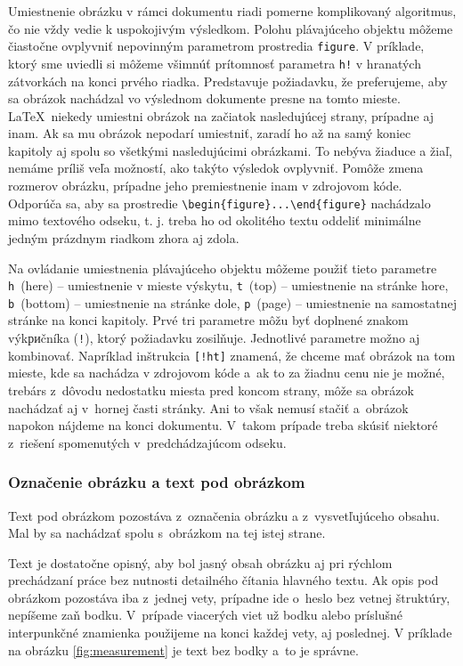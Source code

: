 \documentclass[../../../thesis.tex]{subfiles}
\begin{document}
Umiestnenie obrázku v rámci dokumentu riadi pomerne
komplikovaný algoritmus, čo nie vždy vedie k uspokojivým výsledkom.
Polohu plávajúceho objektu môžeme čiastočne ovplyvniť
nepovinným parametrom prostredia \verb|figure|.
V príklade, ktorý sme uviedli si môžeme všimnúť prítomnosť parametra \verb|h!| v hranatých zátvorkách
na konci prvého riadka.
Predstavuje požiadavku, že preferujeme,  aby sa obrázok nachádzal vo výslednom dokumente presne na tomto mieste. \LaTeX\ niekedy umiestni obrázok na začiatok nasledujúcej strany, prípadne aj inam.
Ak sa mu obrázok nepodarí umiestniť, zaradí ho až na
samý koniec kapitoly aj spolu so všetkými nasledujúcimi obrázkami.
To nebýva žiaduce a žiaľ, nemáme príliš veľa možností, ako takýto výsledok ovplyvniť.
Pomôže zmena rozmerov obrázku, prípadne jeho premiestnenie inam v zdrojovom kóde.
Odporúča sa, aby sa prostredie \verb|\begin{figure}...\end{figure}| nachádzalo mimo textového odseku, t. j. treba ho od okolitého textu oddeliť minimálne jedným prázdnym riadkom zhora aj zdola.

Na ovládanie umiestnenia plávajúceho objektu môžeme použiť tieto
parametre \verb|h|~(here) -- umiestnenie v mieste výskytu,
\verb|t|~(top) -- umiestnenie na stránke hore, \verb|b|~(bottom) --
umiestnenie na stránke dole, \verb|p|~(page) -- umiestnenie
na samostatnej stránke na konci kapitoly. Prvé tri
parametre môžu byť doplnené znakom výkриčníka (\verb|!|),
ktorý požiadavku zosilňuje.
Jednotlivé parametre možno aj kombinovať.
Napríklad inštrukcia \verb|[!ht]| znamená, že chceme mať
obrázok na tom mieste, kde sa nachádza v zdrojovom kóde
a~ak to za žiadnu cenu nie je možné,
trebárs z~dôvodu nedostatku miesta pred koncom strany,
môže sa obrázok nachádzať aj v~hornej časti stránky.
Ani to však nemusí stačiť a~obrázok napokon nájdeme
na konci dokumentu.
V~takom prípade treba skúsiť niektoré
z~riešení spomenutých v~predchádzajúcom odseku.

\subsubsection{Označenie obrázku a text pod obrázkom}
Text pod obrázkom pozostáva z~označenia obrázku a z~vysvetľujúceho obsahu.
Mal by sa nachádzať spolu s~obrázkom na tej istej strane.

Text je dostatočne opisný,
aby bol jasný obsah obrázku aj pri rýchlom prechádzaní
práce bez nutnosti detailného čítania hlavného textu.
Ak opis pod obrázkom pozostáva iba z~jednej vety,
prípadne ide o~heslo bez vetnej štruktúry,
nepíšeme zaň bodku.
V~prípade viacerých viet už bodku alebo príslušné interpunkčné
znamienka použijeme na konci každej vety,
aj poslednej.
V príklade na obrázku \ref{fig:measurement} je text bez bodky
a~to je správne.
\end{document}
